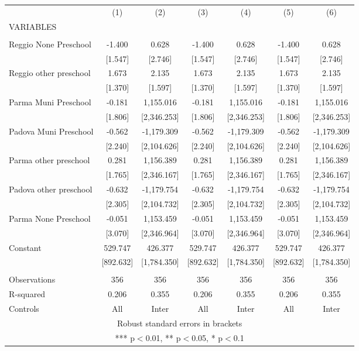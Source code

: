 \begin{tabular}{lcccccc} \hline
 & (1) & (2) & (3) & (4) & (5) & (6) \\
VARIABLES &  &  &  &  &  &  \\ \hline
 &  &  &  &  &  &  \\
Reggio None Preschool & -1.400 & 0.628 & -1.400 & 0.628 & -1.400 & 0.628 \\
 & [1.547] & [2.746] & [1.547] & [2.746] & [1.547] & [2.746] \\
Reggio other preschool & 1.673 & 2.135 & 1.673 & 2.135 & 1.673 & 2.135 \\
 & [1.370] & [1.597] & [1.370] & [1.597] & [1.370] & [1.597] \\
Parma Muni Preschool & -0.181 & 1,155.016 & -0.181 & 1,155.016 & -0.181 & 1,155.016 \\
 & [1.806] & [2,346.253] & [1.806] & [2,346.253] & [1.806] & [2,346.253] \\
Padova Muni Preschool & -0.562 & -1,179.309 & -0.562 & -1,179.309 & -0.562 & -1,179.309 \\
 & [2.240] & [2,104.626] & [2.240] & [2,104.626] & [2.240] & [2,104.626] \\
Parma other preschool & 0.281 & 1,156.389 & 0.281 & 1,156.389 & 0.281 & 1,156.389 \\
 & [1.765] & [2,346.167] & [1.765] & [2,346.167] & [1.765] & [2,346.167] \\
Padova other preschool & -0.632 & -1,179.754 & -0.632 & -1,179.754 & -0.632 & -1,179.754 \\
 & [2.305] & [2,104.732] & [2.305] & [2,104.732] & [2.305] & [2,104.732] \\
Parma None Preschool & -0.051 & 1,153.459 & -0.051 & 1,153.459 & -0.051 & 1,153.459 \\
 & [3.070] & [2,346.964] & [3.070] & [2,346.964] & [3.070] & [2,346.964] \\
Constant & 529.747 & 426.377 & 529.747 & 426.377 & 529.747 & 426.377 \\
 & [892.632] & [1,784.350] & [892.632] & [1,784.350] & [892.632] & [1,784.350] \\
 &  &  &  &  &  &  \\
Observations & 356 & 356 & 356 & 356 & 356 & 356 \\
R-squared & 0.206 & 0.355 & 0.206 & 0.355 & 0.206 & 0.355 \\
 Controls & All & Inter & All & Inter & All & Inter \\ \hline
\multicolumn{7}{c}{ Robust standard errors in brackets} \\
\multicolumn{7}{c}{ *** p$<$0.01, ** p$<$0.05, * p$<$0.1} \\
\end{tabular}
